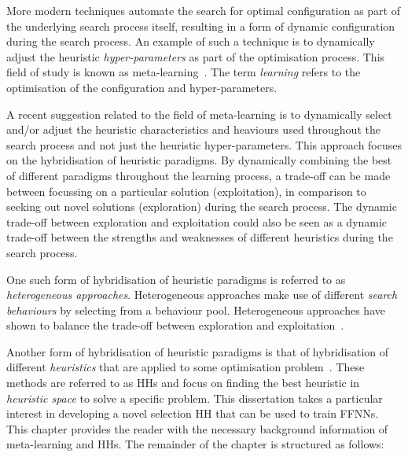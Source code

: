More modern techniques automate the search for optimal configuration as part of the underlying search process itself, resulting in a form of dynamic configuration during the search process. An example of such a technique is to dynamically adjust the heuristic \textit{hyper-parameters} as part of the optimisation process. This field of study is known as meta-learning~\cite{ref:giraud:2004}. The term \textit{learning} refers to the optimisation of the configuration and hyper-parameters.

A recent suggestion related to the field of meta-learning is to dynamically select and/or adjust the heuristic characteristics and heaviours used throughout the search process and not just the heuristic hyper-parameters. This approach focuses on the hybridisation of heuristic paradigms. By dynamically combining the best of different  paradigms throughout the learning process, a trade-off can be made between focussing on a particular solution (exploitation), in comparison to seeking out novel solutions (exploration) during the search process. The dynamic trade-off between exploration and exploitation could also be seen as a dynamic trade-off between the strengths and weaknesses of different heuristics during the search process.

One such form of hybridisation of heuristic paradigms is referred to as \textit{heterogeneous approaches}. Heterogeneous approaches make use of different \textit{search behaviours} by selecting from a behaviour pool. Heterogeneous approaches have shown to balance the trade-off between exploration and exploitation~\cite{ref:nepomuceno:2013}.

Another form of hybridisation of heuristic paradigms is that of hybridisation of different \textit{heuristics} that are applied to some optimisation problem~\cite{ref:burke:2013}. These methods are referred to as \acfp{HH} and focus on finding the best heuristic in \textit{heuristic space} to solve a specific problem. This dissertation takes a particular interest in developing a novel selection \acs{HH} that can be used to train \acp{FFNN}. This chapter provides the reader with the necessary background information of meta-learning and \acp{HH}. The remainder of the chapter is structured as follows:

